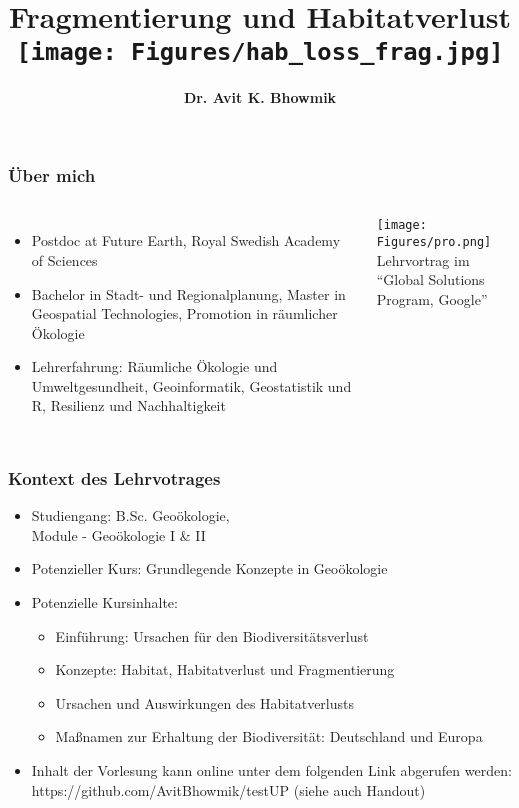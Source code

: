 \documentclass{beamer}
\title[Lehrvortrag. Universität Potsdam.\\2019]{\LARGE Fragmentierung und Habitatverlust\\[0.1cm]
\texttt{[image: Figures/hab\_loss\_frag.jpg]}\vspace{-0.4cm}} %
\author[Avit K. Bhowmik]{\vspace{-0.4cm}\textbf{Dr. Avit K. Bhowmik}} %
\institute[The Royal Swedish Academy of Sciences] %
{\vspace{-0.3cm}
\textit{avit.bhowmik@futureearth.org}%
}
\date[\small January 25, 2019]{January 25, 2019 \\ \raggedright
\texttt{[image: Figures/KVA\_logo.png]}} %
\begin{document}
\begin{frame}
\titlepage %
\end{frame}


\begin{frame}
\frametitle{Über mich}
\begin{columns}
\begin{itemize}
\item Postdoc at Future Earth, Royal Swedish Academy of Sciences
\item Bachelor in Stadt- und Regionalplanung, Master in Geospatial Technologies, Promotion in räumlicher Ökologie
\item Lehrerfahrung: Räumliche Ökologie und Umweltgesundheit, Geoinformatik, Geostatistik und R, Resilienz und Nachhaltigkeit
\end{itemize}
\hspace{0.5cm}
\raggedleft
\texttt{[image: Figures/pro.png]}\\
\centering
\tiny Lehrvortrag im ``Global Solutions Program, Google''
\end{columns}
\end{frame}


\begin{frame}
  \frametitle{Kontext des Lehrvotrages}
\begin{itemize}
\item Studiengang: B.Sc. Geoökologie,\\Module - Geoökologie I \& II
\item Potenzieller Kurs: Grundlegende Konzepte in Geoökologie
\item \alert{Potenzielle Kursinhalte}:
\begin{itemize}
\item Einführung: Ursachen für den Biodiversitätsverlust
\item Konzepte: Habitat, Habitatverlust und Fragmentierung
\item Ursachen und Auswirkungen des Habitatverlusts
\item Maßnamen zur Erhaltung der Biodiversität: Deutschland und Europa
\end{itemize}
\item Inhalt der Vorlesung kann online unter dem folgenden Link abgerufen werden: \alert{https://github.com/AvitBhowmik/testUP} (siehe auch Handout)
\end{itemize}
\end{frame}
\end{document}
